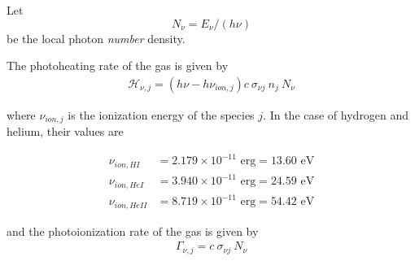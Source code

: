 Let 
\begin{equation}
    N_\nu = E_\nu / (h \nu)
\end{equation}
be the local photon \emph{number} density.

The photoheating rate of the gas is given by
\begin{align}
\mathcal{H}_{\nu, j} = (h \nu - h \nu_{ion,j}) c \ \sigma_{\nu j} \ n_j \ N_\nu
\end{align}

where $\nu_{ion,j}$ is the ionization energy of the species $j$. In the case of
hydrogen and helium, their values are

\begin{align}
    \nu_{ion,HI} &= 2.179 \times 10^{-11} \text{ erg} = 13.60 \text{ eV}\\
    \nu_{ion,HeI} &= 3.940 \times 10^{-11} \text{ erg} = 24.59 \text{ eV}\\
    \nu_{ion,HeII} &= 8.719 \times 10^{-11} \text{ erg} = 54.42 \text{ eV}
\end{align}

and the photoionization rate of the gas is given by
\begin{align}
\Gamma_{\nu, j} = c \ \sigma_{\nu j} \ N_\nu
\end{align}
